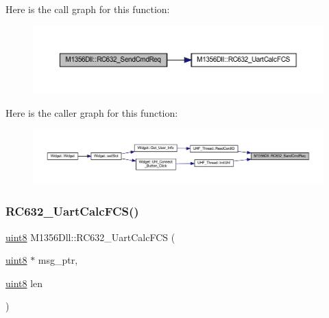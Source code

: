 Here is the call graph for this function\+:
\nopagebreak
\begin{figure}[H]
\begin{center}
\leavevmode
\includegraphics[width=350pt]{class_m1356_dll_a1fef83590eef30001297f59a7073d31e_cgraph}
\end{center}
\end{figure}
Here is the caller graph for this function\+:
\nopagebreak
\begin{figure}[H]
\begin{center}
\leavevmode
\includegraphics[width=350pt]{class_m1356_dll_a1fef83590eef30001297f59a7073d31e_icgraph}
\end{center}
\end{figure}
\mbox{\label{class_m1356_dll_a048d48e3154a48258d25391b19de938c}} 
\subsubsection{\texorpdfstring{RC632\_UartCalcFCS()}{RC632\_UartCalcFCS()}\hspace{0.1cm}{\footnotesize\ttfamily [1/2]}}
{\footnotesize\ttfamily \mbox{\hyperlink{inc_2m1356dll_8h_adde6aaee8457bee49c2a92621fe22b79}{uint8}} M1356\+Dll\+::\+R\+C632\+\_\+\+Uart\+Calc\+F\+CS (\begin{DoxyParamCaption}\item[{\mbox{\hyperlink{inc_2m1356dll_8h_adde6aaee8457bee49c2a92621fe22b79}{uint8}} $\ast$}]{msg\+\_\+ptr,  }\item[{\mbox{\hyperlink{inc_2m1356dll_8h_adde6aaee8457bee49c2a92621fe22b79}{uint8}}}]{len }\end{DoxyParamCaption})}

\mbox{\label{class_m1356_dll_a048d48e3154a48258d25391b19de938c}} 
